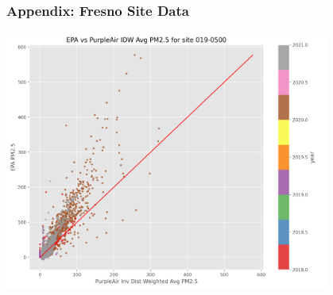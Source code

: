 \documentclass{beamer}
\begin{document}
\begin{frame}
\frametitle{Appendix: Fresno Site Data}

\hspace{5em}
\includegraphics[width=0.8\textwidth]{pics/appendix/site_plots/site-019-0500_epa-pa-hourly-plot.png}
\end{frame}
\end{document}
